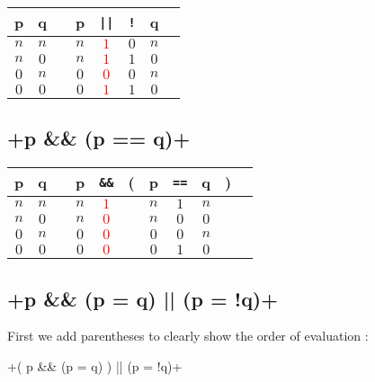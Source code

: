 \documentclass[a4paper,11pt]{report}
\begin{document}
\begin{center}
  \begin{tabular}{@{ }c@{ }@{ }c | c@{ }@{ }c@{ }@{ }c@{ }@{ }c@{ }@{ }c@{ }@{ }c}
    p & q &  & p & \verb+||+ & \verb+!+ & q & \\
    \hline 
    $n$ & $n$ &  & $n$ & \textcolor{red}{$1$} & $0$ & $n$ & \\
    $n$ & $0$ &  & $n$ & \textcolor{red}{$1$} & $1$ & $0$ & \\
    $0$ & $n$ &  & $0$ & \textcolor{red}{$0$} & $0$ & $n$ & \\
    $0$ & $0$ &  & $0$ & \textcolor{red}{$1$} & $1$ & $0$ & \\
  \end{tabular}
\end{center}

\subsection*{\cinline+p && (p == q)+}

\begin{center}
  \begin{tabular}{@{ }c@{ }@{ }c | c@{ }@{ }c@{ }@{ }c@{ }@{}c@{}@{ }c@{ }@{ }c@{ }@{ }c@{ }@{}c@{}@{ }c}
    p & q &  & p & \verb+&&+ & ( & p & \verb+==+ & q & ) & \\
    \hline 
    $n$ & $n$ &  & $n$ & \textcolor{red}{$1$} &  & $n$ & $1$ & $n$ &  & \\
    $n$ & $0$ &  & $n$ & \textcolor{red}{$0$} &  & $n$ & $0$ & $0$ &  & \\
    $0$ & $n$ &  & $0$ & \textcolor{red}{$0$} &  & $0$ & $0$ & $n$ &  & \\
    $0$ & $0$ &  & $0$ & \textcolor{red}{$0$} &  & $0$ & $1$ & $0$ &  & \\
  \end{tabular}
\end{center}

\subsection*{\cinline+p && (p = q) || (p = !q)+}

First we add parentheses to clearly show the order of evaluation :

\cinline+( p && (p = q) ) || (p = !q)+
\end{document}
